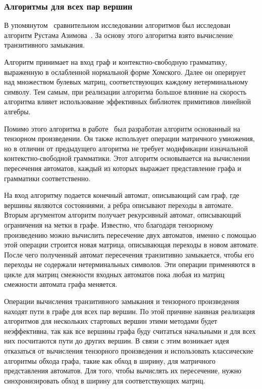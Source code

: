 \subsubsection{Алгоритмы для всех пар вершин}

В упомянутом~\cite{intro_eval_cfpq} сравнительном исследовании алгоритмов был исследован алгоритм Рустама Азимова~\cite{related_rustam_azimov}. За основу этого алгоритма взято вычисление транзитивного замыкания.

Алгоритм принимает на вход граф и контекстно-свободную грамматику, выраженную в ослабленной нормальной форме Хомского. Далее он оперирует над множеством булевых матриц, соответствующих каждому нетерминальному символу. Тем самым, при реализации алгоритма большое влияние на скорость алгоритма влияет использование эффективных библиотек примитивов линейной алгебры.

Помимо этого алгоритма в работе~\cite{related_kron} был разработан алгоритм основанный на тензорном произведении. Он также использует операции матричного умножения, но в отличии от предыдущего алгоритма не требует модификации изначальной контекстно-свободной грамматики. Этот алгоритм основывается на вычислении пересечения автоматов, каждый из которых выражает представление графа и грамматики соответственно. 

На вход алгоритму подается конечный автомат, описывающий сам граф, где вершины являются состояниями, а ребра описывают переходы в автомате. Вторым аргументом алгоритм получает рекурсивный автомат, описывающий ограничения на метки в графе. Известно, что благодаря тензорному произведению можно вычислить пересечение двух автоматов, именно с помощью этой операции строится новая матрица, описывающая переходы в новом автомате. После чего полученный автомат пересечения транзитивно замыкается, чтобы его переходы не содержали нетерминальных символов. Эти операции применяются в цикле для матриц смежности входных автоматов пока любая из матриц смежности автомата графа меняется.

Операции вычисления транзитивного замыкания и тензорного произведения находят пути в графе для всех пар вершин. По этой причине наивная реализация алгоритмов для нескольких стартовых вершин этими методами будет неэффективна, так как все вершины графа буду считаться начальными и для всех них посчитаются пути до других вершин. В связи с этим возникает идея отказаться от вычисления тензорного произведения и использовать классические алгоритмы обхода графа, такие как обход в ширину, для матричного представления автоматов. Для того, чтобы вычислять их пересечение, нужно синхронизировать обход в ширину для соответствующих матриц. 

